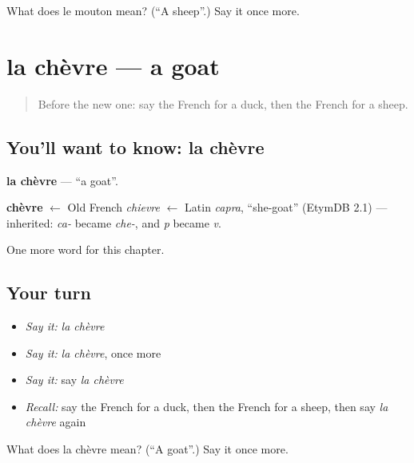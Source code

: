\begin{tcolorbox}[breakable,colback=teal!4,colframe=teal!35!black,title={Before you move on}]
What does le mouton mean? (\textquotedblleft{}A sheep\textquotedblright{}.) Say it once more.
\end{tcolorbox}
\section[la chèvre]{la chèvre — a goat}

\label{lesson:FR-C87-chevre}



\begin{quote}
Before the new one: say the French for a duck, then the French for a sheep.
\end{quote}

\subsection*{You'll want to know: la chèvre}
\textbf{la chèvre} — \textquotedblleft{}a goat\textquotedblright{}.

\begin{cousinweb}
\textbf{chèvre} $\leftarrow$ Old French \emph{chievre} $\leftarrow$ Latin \emph{capra}, \textquotedblleft{}she-goat\textquotedblright{} (EtymDB 2.1) — inherited: \emph{ca-} became \emph{che-}, and \emph{p} became \emph{v}.
\end{cousinweb}

\begin{grammarlens}[title={What you've built}]
One more word for this chapter.
\end{grammarlens}

\subsection*{Your turn}
\begin{itemize}
\raggedright
  \item \emph{Say it:} \emph{la chèvre}
  \item \emph{Say it:} \emph{la chèvre}, once more
  \item \emph{Say it:} say \emph{la chèvre}
  \item \emph{Recall:} say the French for a duck, then the French for a sheep, then say \emph{la chèvre} again
\end{itemize}

\begin{tcolorbox}[breakable,colback=teal!4,colframe=teal!35!black,title={Before you move on}]
What does la chèvre mean? (\textquotedblleft{}A goat\textquotedblright{}.) Say it once more.
\end{tcolorbox}

